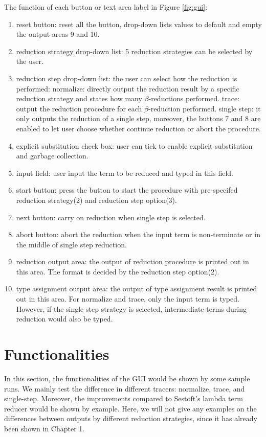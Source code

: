 \noindent The function of each button or text area label in Figure \ref{fig:gui}:
\begin{enumerate}
\item reset button: reset all the button, drop-down lists values to default and empty the output areas 9 and 10.
\item reduction strategy drop-down list: 5 reduction strategies can be selected by the user.
\item reduction step drop-down list: the user can select how the reduction is performed: normalize: directly output the reduction result by a specific reduction strategy and states how many $\beta$-reductions performed. trace: output the reduction procedure for each $\beta$-reduction performed. single step: it only outputs the reduction of a single step, moreover, the buttons 7 and 8 are enabled to let user choose whether continue reduction or abort the procedure.  
\item explicit substitution check box: user can tick to enable explicit substitution and garbage collection.
\item input field: user input the term to be reduced and typed in this field.
\item start button: press the button to start the procedure with pre-specifed reduction strategy(2) and reduction step option(3).
\item next button: carry on reduction when single step is selected.
\item abort button: abort the reduction when the input term is non-terminate or in the middle of single step reduction.
\item reduction output area: the output of reduction procedure is printed out in this area. The format is decided by the reduction step option(2).
\item type assignment output area: the output of type assignment result is printed out in this area. For normalize and trace, only the input term is typed. However, if the single step strategy is selected, intermediate terms during reduction would also be typed.
\end{enumerate}


\section{Functionalities}

In this section, the functionalities of the GUI would be shown by some sample runs. We mainly test the difference in different tracers: normalize, trace, and single-step. Moreover, the improvements compared to Sestoft's lambda term reducer would be shown by example. Here, we will not give any examples on the differences between outputs by different reduction strategies, since it has already been shown in Chapter 1. 

